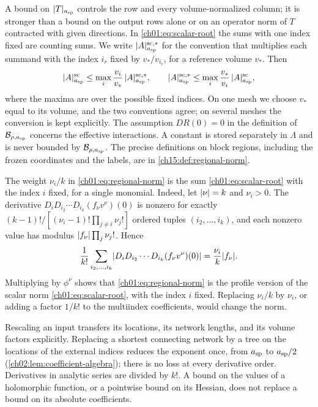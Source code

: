A bound on $\lvert T\rvert_{a_{\mathrm{sp}}}$ controls the row and every volume-normalized column; it is stronger than a bound on the output rows alone or on an operator norm of $T$ contracted with given directions. In \eqref{ch01:eq:scalar-root} the sums with one index fixed are counting sums. We write $\lvert A\rvert^{\mathrm{sc},*}_{a_{\mathrm{sp}}}$ for the convention that multiplies each summand with the index $i_r$ fixed by $v_*/v_{i_r}$, for a reference volume $v_*$. Then
\[
 \lvert A\rvert^{\mathrm{sc}}_{a_{\mathrm{sp}}}\le\max_i\frac{v_i}{v_*}\,\lvert A\rvert^{\mathrm{sc},*}_{a_{\mathrm{sp}}},\qquad
 \lvert A\rvert^{\mathrm{sc},*}_{a_{\mathrm{sp}}}\le\max_i\frac{v_*}{v_i}\,\lvert A\rvert^{\mathrm{sc}}_{a_{\mathrm{sp}}},
\]
where the maxima are over the possible fixed indices. On one mesh we choose $v_*$ equal to its volume, and the two conventions agree; on several meshes the conversion is kept explicitly. The assumption $DR(0)=0$ in the definition of $\mathcal B_{\rho,a_{\mathrm{sp}}}$ concerns the effective interactions. A constant is stored separately in $\Lambda$ and is never bounded by $\mathcal B_{\rho,a_{\mathrm{sp}}}$. The precise definitions on block regions, including the frozen coordinates and the labels, are in \cref{ch15:def:regional-norm}.

\begin{remark}\label{ch01:rem:factorial}
The weight $\nu_i/k$ in \eqref{ch01:eq:regional-norm} is the sum \eqref{ch01:eq:scalar-root} with the index $i$ fixed, for a single monomial. Indeed, let $\lvert \nu\rvert=k$ and $\nu_i>0$. The derivative $D_iD_{i_2}\cdots D_{i_k}(f_\nu v^\nu)(0)$ is nonzero for exactly $(k-1)!/[(\nu_i-1)!\prod_{j\ne i}\nu_j!]$ ordered tuples $(i_2,\dots,i_k)$, and each nonzero value has modulus $\lvert f_\nu\rvert\prod_j\nu_j!$. Hence
\[
 \frac1{k!}\sum_{i_2,\dots,i_k}\lvert D_iD_{i_2}\cdots D_{i_k}(f_\nu v^\nu)(0)\rvert=\frac{\nu_i}{k}\lvert f_\nu\rvert.
\]
Multiplying by $\phi^\nu$ shows that \eqref{ch01:eq:regional-norm} is the profile version of the scalar norm \eqref{ch01:eq:scalar-root}, with the index $i$ fixed. Replacing $\nu_i/k$ by $\nu_i$, or adding a factor $1/k!$ to the multiindex coefficients, would change the norm.
\end{remark}

Rescaling an input transfers its locations, its network lengths, and its volume factors explicitly. Replacing a shortest connecting network by a tree on the locations of the external indices reduces the exponent once, from $a_{\mathrm{sp}}$ to $a_{\mathrm{sp}}/2$ (\cref{ch02:lem:coefficient-algebra}); there is no loss at every derivative order. Derivatives in analytic series are divided by $k!$. A bound on the values of a holomorphic function, or a pointwise bound on its Hessian, does not replace a bound on its absolute coefficients.

